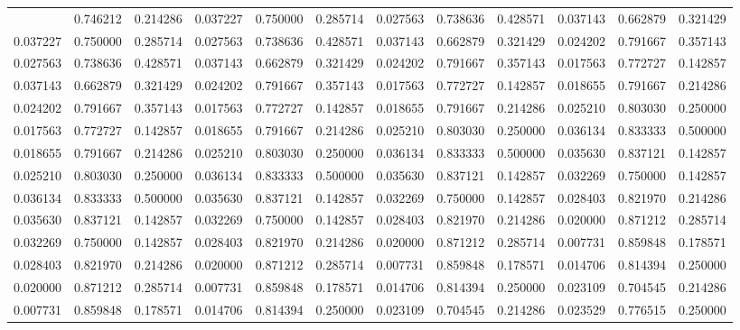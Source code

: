 \begin{longtable}{cccccccccccc}
\bottomrule
\endlastfoot
  0.025462 &   0.746212 &   0.214286 &   0.037227 &   0.750000 &   0.285714 &   0.027563 &   0.738636 &   0.428571 & 0.037143 & 0.662879 & 0.321429 \\
  0.037227 &   0.750000 &   0.285714 &   0.027563 &   0.738636 &   0.428571 &   0.037143 &   0.662879 &   0.321429 & 0.024202 & 0.791667 & 0.357143 \\
  0.027563 &   0.738636 &   0.428571 &   0.037143 &   0.662879 &   0.321429 &   0.024202 &   0.791667 &   0.357143 & 0.017563 & 0.772727 & 0.142857 \\
  0.037143 &   0.662879 &   0.321429 &   0.024202 &   0.791667 &   0.357143 &   0.017563 &   0.772727 &   0.142857 & 0.018655 & 0.791667 & 0.214286 \\
  0.024202 &   0.791667 &   0.357143 &   0.017563 &   0.772727 &   0.142857 &   0.018655 &   0.791667 &   0.214286 & 0.025210 & 0.803030 & 0.250000 \\
  0.017563 &   0.772727 &   0.142857 &   0.018655 &   0.791667 &   0.214286 &   0.025210 &   0.803030 &   0.250000 & 0.036134 & 0.833333 & 0.500000 \\
  0.018655 &   0.791667 &   0.214286 &   0.025210 &   0.803030 &   0.250000 &   0.036134 &   0.833333 &   0.500000 & 0.035630 & 0.837121 & 0.142857 \\
  0.025210 &   0.803030 &   0.250000 &   0.036134 &   0.833333 &   0.500000 &   0.035630 &   0.837121 &   0.142857 & 0.032269 & 0.750000 & 0.142857 \\
  0.036134 &   0.833333 &   0.500000 &   0.035630 &   0.837121 &   0.142857 &   0.032269 &   0.750000 &   0.142857 & 0.028403 & 0.821970 & 0.214286 \\
  0.035630 &   0.837121 &   0.142857 &   0.032269 &   0.750000 &   0.142857 &   0.028403 &   0.821970 &   0.214286 & 0.020000 & 0.871212 & 0.285714 \\
  0.032269 &   0.750000 &   0.142857 &   0.028403 &   0.821970 &   0.214286 &   0.020000 &   0.871212 &   0.285714 & 0.007731 & 0.859848 & 0.178571 \\
  0.028403 &   0.821970 &   0.214286 &   0.020000 &   0.871212 &   0.285714 &   0.007731 &   0.859848 &   0.178571 & 0.014706 & 0.814394 & 0.250000 \\
  0.020000 &   0.871212 &   0.285714 &   0.007731 &   0.859848 &   0.178571 &   0.014706 &   0.814394 &   0.250000 & 0.023109 & 0.704545 & 0.214286 \\
  0.007731 &   0.859848 &   0.178571 &   0.014706 &   0.814394 &   0.250000 &   0.023109 &   0.704545 &   0.214286 & 0.023529 & 0.776515 & 0.250000 \\

\end{longtable}
